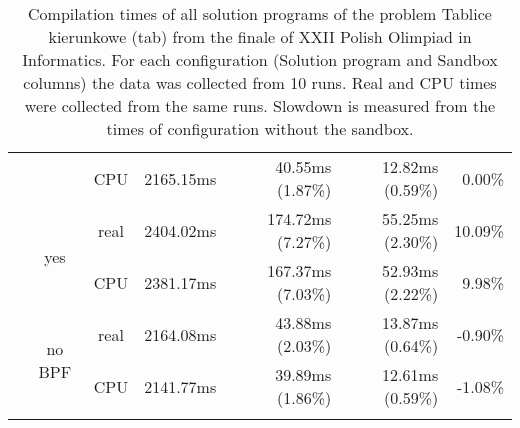 \documentclass[en]{pracamgr}
\begin{document}
\begin{appendices}
\begin{small}
\begin{longtable}{|l|c|c|r|r|r|r|}
                            &                         & CPU  & 2165.15ms & 40.55ms (1.87\%) & 12.82ms (0.59\%) & 0.00\% \\*
                            \cline{2-7}
                            & \multirow{2}{*}{yes}    & real & 2404.02ms & 174.72ms (7.27\%) & 55.25ms (2.30\%) & 10.09\% \\*
                            &                         & CPU  & 2381.17ms & 167.37ms (7.03\%) & 52.93ms (2.22\%) & 9.98\% \\*
                            \cline{2-7}
                            & \multirow{2}{*}{no BPF} & real & 2164.08ms & 43.88ms (2.03\%) & 13.87ms (0.64\%) & -0.90\% \\*
                            &                         & CPU  & 2141.77ms & 39.89ms (1.86\%) & 12.61ms (0.59\%) & -1.08\% \\
\hline
\caption{Compilation times of all solution programs of the problem Tablice kierunkowe (tab) from the finale of XXII Polish Olimpiad in Informatics. For each configuration (Solution program and Sandbox columns) the data was collected from 10 runs. Real and CPU times were collected from the same runs. Slowdown is measured from the times of configuration without the sandbox.}
\label{table:tab_compilation}
\end{longtable}
\end{small}


\end{appendices}
\end{document}
